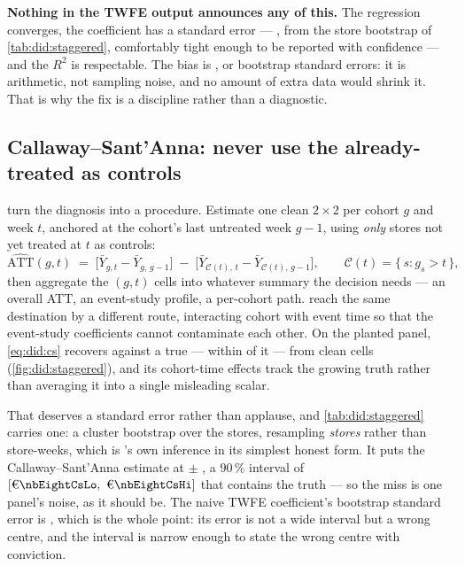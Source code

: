 \textbf{Nothing in the TWFE output announces any of this.} The regression converges, the
coefficient has a standard error --- \eur{\nbEightTwfeSe}, from the store bootstrap of
\cref{tab:did:staggered}, comfortably tight enough to be reported with confidence --- and the $R^2$
is respectable. The bias is \eur{\nbEightTwfeBiasAbs}, or \nbEightTwfeBiasInSe{} bootstrap standard
errors: it is arithmetic, not sampling noise, and no amount of extra data would shrink it. That is
why the fix is a discipline rather than a diagnostic.

\subsection*{Callaway--Sant'Anna: never use the already-treated as controls}

 turn the diagnosis into a procedure. Estimate one clean $2 \times 2$ per cohort
$g$ and week $t$, anchored at the cohort's last untreated week $g - 1$, using \emph{only} stores not
yet treated at $t$ as controls:
%
\begin{equation}
  \widehat{\text{ATT}}(g, t)
  \;=\;
  \big[\bar Y_{g,t} - \bar Y_{g,\,g-1}\big]
  \;-\;
  \big[\bar Y_{\mathcal C(t),\,t} - \bar Y_{\mathcal C(t),\,g-1}\big],
  \qquad
  \mathcal C(t) = \{\, s : g_s > t \,\},
  \label{eq:did:cs}
\end{equation}
%
then aggregate the $(g,t)$ cells into whatever summary the decision needs --- an overall ATT, an
event-study profile, a per-cohort path.  reach the same destination by a
different route, interacting cohort with event time so that the event-study coefficients cannot
contaminate each other. On the planted panel, \cref{eq:did:cs} recovers \eur{\nbEightCsAtt} against a
true \eur{\nbEightCsTrue} --- within \eur{\nbEightCsErrAbs} of it --- from \nbEightCsCells{} clean
cells (\cref{fig:did:staggered}), and its
cohort-time effects track the growing truth rather than averaging it into a single misleading
scalar.

That \eur{\nbEightCsErrAbs} deserves a standard error rather than applause, and
\cref{tab:did:staggered} carries one: a cluster bootstrap over the stores, resampling
\emph{stores} rather than store-weeks, which is \citeauthor{callaway2021}'s own inference in its
simplest honest form. It puts the Callaway--Sant'Anna estimate at
\eur{\nbEightCsAtt} $\pm$ \eur{\nbEightCsSe}, a 90\,\% interval of
$[\eur{\nbEightCsLo},\ \eur{\nbEightCsHi}]$ that contains the truth --- so the miss is one panel's
noise, as it should be. The naive TWFE coefficient's bootstrap standard error is
\eur{\nbEightTwfeSe}, which is the whole point: its error is not a wide interval but a wrong centre,
and the interval is narrow enough to state the wrong centre with conviction.

